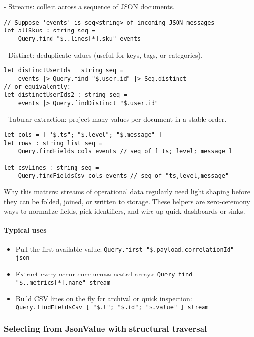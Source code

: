 \documentclass{article}
\begin{document}
- Streams: collect across a sequence of JSON documents.
\begin{verbatim}
// Suppose 'events' is seq<string> of incoming JSON messages
let allSkus : string seq =
    Query.find "$..lines[*].sku" events
\end{verbatim}

- Distinct: deduplicate values (useful for keys, tags, or categories).
\begin{verbatim}
let distinctUserIds : string seq =
    events |> Query.find "$.user.id" |> Seq.distinct
// or equivalently:
let distinctUserIds2 : string seq =
    events |> Query.findDistinct "$.user.id"
\end{verbatim}

- Tabular extraction: project many values per document in a stable order.
\begin{verbatim}
let cols = [ "$.ts"; "$.level"; "$.message" ]
let rows : string list seq =
    Query.findFields cols events // seq of [ ts; level; message ]

let csvLines : string seq =
    Query.findFieldsCsv cols events // seq of "ts,level,message"
\end{verbatim}

Why this matters: streams of operational data regularly need light shaping before they can be folded, joined, or written to storage. These helpers are zero-ceremony ways to normalize fields, pick identifiers, and wire up quick dashboards or sinks.

\paragraph{Typical uses}
\begin{itemize}
  \item Pull the first available value: \texttt{Query.first "\$.payload.correlationId" json}
  \item Extract every occurrence across nested arrays: \texttt{Query.find "\$..metrics[*].name" stream}
  \item Build CSV lines on the fly for archival or quick inspection: \texttt{Query.findFieldsCsv [ "\$.t"; "\$.id"; "\$.value" ] stream}
\end{itemize}

\subsubsection{Selecting from JsonValue with structural traversal}
\end{document}
